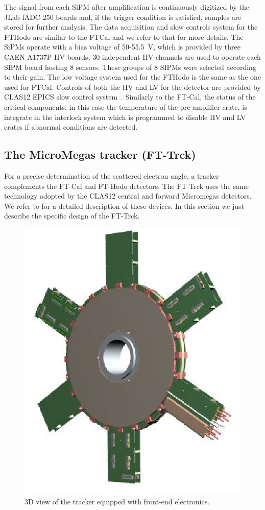 The signal from each SiPM after amplification is continuously digitized by the JLab fADC 250 boards and, if the trigger condition is satisfied, samples are stored for further analysis. The data acquisition and slow controls system for the FTHodo are similar to the FTCal and we refer to that for more details. The SiPMs operate with a bias voltage of 50-55.5~V, which is provided by three CAEN A1737P HV boards. 30 independent HV channels are used to operate each SIPM board hosting 8 sensors. These groups of 8 SIPMs were selected according to their gain. The low voltage system used for the FTHodo is the same as the one used for FTCal. Controls of both the HV and LV for the detector are provided by CLAS12 EPICS slow control system~\cite{daq}. Similarly to the FT-Cal, the status of the critical components, in this case the temperature of the pre-amplifier crate, is integrate in the interlock system which is programmed to disable HV and LV crates if abnormal conditions are detected.


\subsection{The MicroMegas tracker (FT-Trck)}
For a precise determination of the scattered electron angle, a tracker complements the FT-Cal and FT-Hodo detectors. The FT-Trck uses the same technology adopted by the CLAS12 central and forward Micromegas detectors. We refer to \cite{mm} for a detailed description of  these devices. In this section we just describe the specific design of the FT-Trck.
\begin{figure}[th!]
\centering 
\includegraphics[width=1.0\columnwidth]{./fig/FTtrck.eps}
\caption{3D view of the tracker equipped with front-end electronics.}
\label{fig:ft-trck} 
\end{figure}

